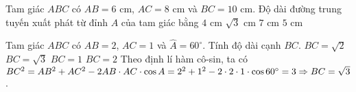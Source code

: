 \begin{ex}%
	Tam giác $ ABC$ có $ AB=6$ cm, $AC=8$ cm và $ BC=10$ cm. Độ dài đường trung tuyến xuất phát từ đỉnh $ A$ của tam giác bằng
	\choice
	{$ 4$ cm}
	{$ \sqrt{3}$ cm}
	{$ 7$ cm}
	{\True $ 5$ cm}
\end{ex}


\begin{ex}%
	Tam giác $ ABC$ có $ AB=2$, $AC=1$ và $ \widehat{A}=60^\circ $. Tính độ dài cạnh $ BC$.
	\choice
	{$ BC=\sqrt{2}$}
	{\True $ BC=\sqrt{3}$}
	{$ BC=1$}
	{$ BC=2$}
	\loigiai
	{Theo định lí hàm cô-sin, ta có\\
		$ BC^2=AB^2+AC^2-2AB\cdot AC\cdot \cos{A}=2^2+1^2-2\cdot 2\cdot 1\cdot \cos 60^\circ =3\\
		\Rightarrow BC=\sqrt{3}$.}
\end{ex}


